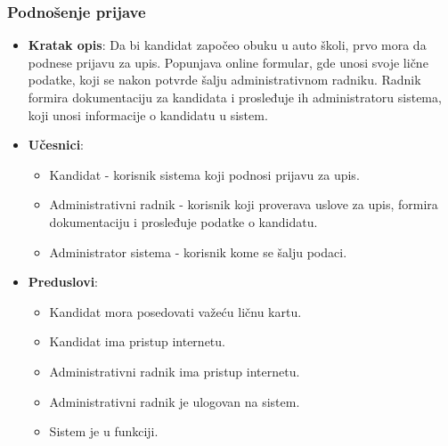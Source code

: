 \subsubsection{Podnošenje prijave}
\label{subsubsec:prijava}
\begin{itemize}
  \item \textbf{Kratak opis}: Da bi kandidat započeo obuku u auto školi, prvo mora da podnese prijavu za upis. Popunjava online formular, gde unosi svoje lične podatke, koji se nakon potvrde šalju administrativnom radniku. Radnik formira dokumentaciju za kandidata i prosleđuje ih administratoru sistema, koji unosi informacije o kandidatu u sistem.
  \item \textbf{Učesnici}: 
    \begin{itemize} 
      \item Kandidat - korisnik sistema koji podnosi prijavu za upis.
      \item Administrativni radnik - korisnik koji proverava uslove za upis,  formira dokumentaciju i prosleđuje podatke o kandidatu.
      \item Administrator sistema -  korisnik kome se šalju podaci.
    \end{itemize} 
  \item \textbf{Preduslovi}:
    \begin{itemize}
    \item Kandidat mora posedovati važeću ličnu kartu.
    \item Kandidat ima pristup internetu.
    \item Administrativni radnik ima pristup internetu.
    \item Administrativni radnik je ulogovan na sistem.
    \item Sistem je u funkciji.
    

\end{itemize}
\end{itemize}
